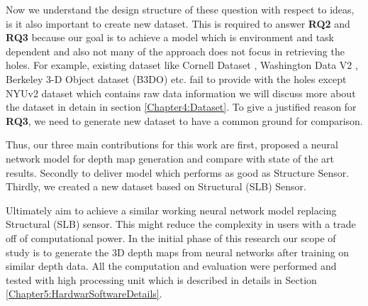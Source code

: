 Now we understand the design structure of these question with respect to ideas, is it also important to create new dataset. This is required to answer \textbf{RQ2} and \textbf{RQ3}  because our goal is to achieve a model which is environment and task dependent and also not many of the approach does not focus in retrieving the holes. For example, existing dataset like Cornell Dataset \cite{3Dscene} , Washington Data V2 \cite{Washington}, Berkeley 3-D Object dataset (B3DO) \cite{Janoch:EECS-2012-85} etc. fail to provide with the holes except NYUv2 dataset which contains raw data information we will discuss more about the dataset in detain in section \ref{Chapter4:Dataset}. To give a justified reason for \textbf{RQ3}, we need to generate new dataset to have a common ground for comparison. 

Thus, our three main contributions for this work are first, proposed a neural network model for depth map generation and compare with state of the art results. Secondly to deliver model which performs as good as Structure Sensor. Thirdly,  we created a new dataset based on Structural (SLB) Sensor.

Ultimately aim to achieve a similar working neural network model replacing Structural (SLB) sensor. This might reduce the complexity in users with a trade off of computational power. In the initial phase of this research our scope of study is to generate the 3D depth maps from neural networks after training on similar depth data. All the computation and evaluation were performed and tested with high processing unit which is described in details in Section \ref{Chapter5:HardwarSoftwareDetails}.


